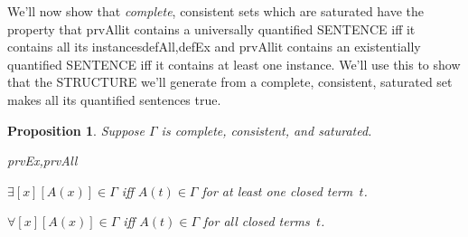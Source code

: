 \documentclass[10pt,a4paper]{article}
\newcommand*{\olup}[1]{\MakeUppercase{#1}}
\theoremstyle{plain}
\newtheorem{prop}[thm]{Proposition}
\theoremstyle{definition}
\theoremstyle{remark}
\newenvironment{explain}{}{}
\newcommand*{\ollabel}[1]{\label{#1}}
\providecommand{\lforall}{\mathord{\forall}}
\providecommand{\lexists}{\mathord{\exists}}
\providecommand{\iftag}[1]{#1}
\providecommand{\tagitem}[1]{\item[#1]}
\providecommand{\iftag}{}
\begin{document}
\begin{explain}
We'll now show that \emph{complete}, consistent sets which are
saturated have the property that \iftag{prvAll}{it contains a
  universally quantified \olup{sentence} iff it contains all its
  instances}{}\iftag{defAll,defEx}{}{ and }\iftag{prvAll}{it contains an
  existentially quantified \olup{sentence} iff it contains at least one
  instance}{}. We'll use this to show that the \olup{structure} we'll
generate from a complete, consistent, saturated set makes all its
quantified sentences true.
\end{explain}

\begin{prop}\ollabel{prop:saturated-instances}
Suppose $\Gamma$ is complete, consistent, and saturated.
\begin{tagenumerate}{prvEx,prvAll}
\tagitem{prvEx}{$\lexists[x][A(x)] \in \Gamma$ iff $A(t) \in \Gamma$
  for at least one closed term~$t$.}{}
\tagitem{prvAll}{$\lforall[x][A(x)] \in \Gamma$ iff $A(t) \in \Gamma$
  for all closed terms~$t$.}{}
\end{tagenumerate}
\end{prop}
\end{document}

